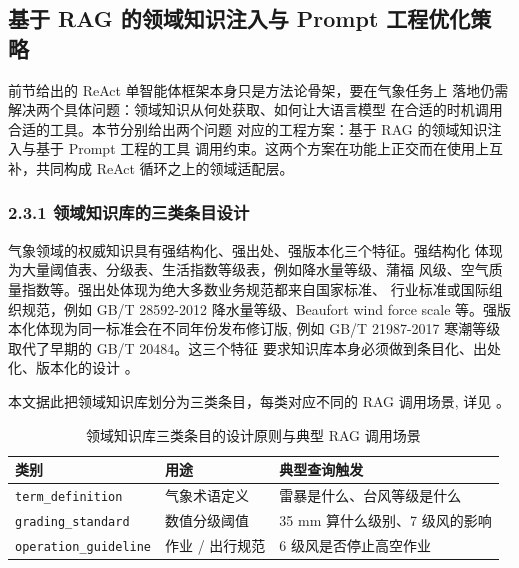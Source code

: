 
\subsection{基于 RAG 的领域知识注入与 Prompt 工程优化策略}
\label{sec:rag-prompt}

前节给出的 ReAct 单智能体框架本身只是方法论骨架，要在气象任务上
落地仍需解决两个具体问题：领域知识从何处获取、如何让大语言模型
在合适的时机调用合适的工具。本节分别给出两个问题
对应的工程方案：基于 RAG 的领域知识注入与基于 Prompt 工程的工具
调用约束。这两个方案在功能上正交而在使用上互补，共同构成 ReAct
循环之上的领域适配层。

\subsubsection*{2.3.1 \quad 领域知识库的三类条目设计}

气象领域的权威知识具有强结构化、强出处、强版本化三个特征。强结构化
体现为大量阈值表、分级表、生活指数等级表，例如降水量等级、蒲福
风级、空气质量指数等。强出处体现为绝大多数业务规范都来自国家标准、
行业标准或国际组织规范，例如 GB/T 28592-2012 降水量等级、Beaufort
wind force scale 等。强版本化体现为同一标准会在不同年份发布修订版,
例如 GB/T 21987-2017 寒潮等级取代了早期的 GB/T 20484。这三个特征
要求知识库本身必须做到条目化、出处化、版本化的设计 \cite{ref24}。

本文据此把领域知识库划分为三类条目，每类对应不同的 RAG 调用场景,
详见 。

\begin{table}[!ht]
    \centering
    \caption{领域知识库三类条目的设计原则与典型 RAG 调用场景}
    \label{tab:kb-three-categories}
    \song\fontsize{9pt}{12pt}\selectfont
    \renewcommand{\arraystretch}{0.95}
    \begin{tabular}{lll}
        \toprule
        类别 & 用途 & 典型查询触发 \\
        \midrule
        \texttt{term\_\bk{}definition} & 气象术语定义 & 雷暴是什么、台风等级是什么 \\
        \texttt{grading\_\bk{}standard} & 数值分级阈值 & 35 mm 算什么级别、7 级风的影响 \\
        \texttt{operation\_\bk{}guideline} & 作业 / 出行规范 & 6 级风是否停止高空作业 \\
        \bottomrule
    \end{tabular}
\end{table}

